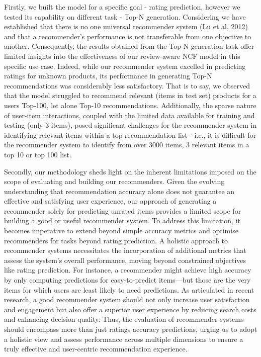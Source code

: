 Firstly, we built the model for a specific goal - rating prediction, however we tested its capability on different task - Top-N generation. Considering we have established that there is no one universal recommender system (Lu et al, 2012) and that a recommender's performance is not transferable from one objective to another. Consequently, the results obtained from the Top-N generation task offer limited insights into the effectiveness of our review-aware NCF model in this specific use case. Indeed, while our recommender system excelled in predicting ratings for unknown products, its performance in generating Top-N recommendations was considerably less satisfactory. That is to say, we observed that the model struggled to recommend relevant (items in test set) products for a users Top-100, let alone Top-10 recommendations. Additionally, the sparse nature of user-item interactions, coupled with the limited data available for training and testing (only 3 items), posed significant challenges for the recommender system in identifying relevant items within a top recommendation list - i.e., it is difficult for the recommender system to identify from over 3000 items, 3 relevant items in a top 10 or top 100 list.

Secondly, our methodology sheds light on the inherent limitations imposed on the scope of evaluating and building our recommenders. Given the evolving understanding that recommendation accuracy alone does not guarantee an effective and satisfying user experience, our approach of generating a recommender solely for predicting unrated items provides a limited scope for building a good or useful recommender system. To address this limitation, it becomes imperative to extend beyond simple accuracy metrics and optimise recommenders for tasks beyond rating prediction. A holistic approach to recommender systems necessitates the incorporation of additional metrics that assess the system's overall performance, moving beyond constrained objectives like rating prediction. For instance, a recommender might achieve high accuracy by only computing predictions for easy-to-predict items—but those are the very items for which users are least likely to need predictions. As articulated in recent research, a good recommender system should not only increase user satisfaction and engagement but also offer a superior user experience by reducing search costs and enhancing decision quality. Thus, the evaluation of recommender systems should encompass more than just ratings accuracy predictions, urging us to adopt a holistic view and assess performance across multiple dimensions to ensure a truly effective and user-centric recommendation experience.


